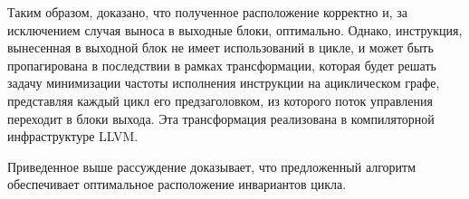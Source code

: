 Таким образом, доказано, что полученное расположение корректно и, за исключением случая выноса в выходные блоки, оптимально.
Однако, инструкция, вынесенная в выходной блок не имеет использований в цикле, и может быть пропагирована в последствии в рамках трансформации, которая будет решать задачу минимизации частоты исполнения инструкции на ациклическом графе, представляя каждый цикл его предзаголовком, из которого поток управления переходит в блоки выхода.
Эта трансформация реализована в компиляторной инфраструктуре LLVM.

Приведенное выше рассуждение доказывает, что предложенный алгоритм обеспечивает оптимальное расположение инвариантов цикла.

\newpage
